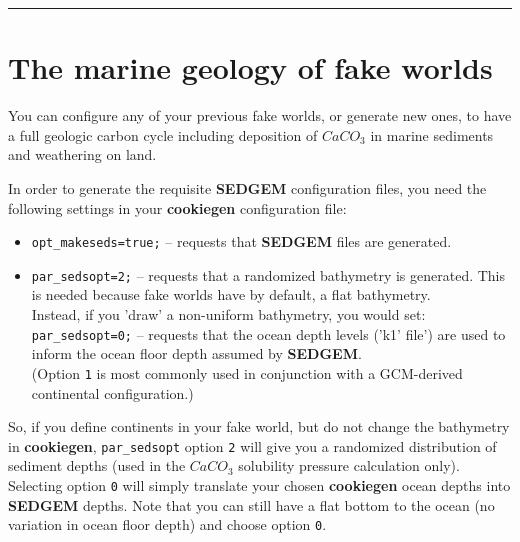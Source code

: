 \vspace{1mm}\noindent\rule{4cm}{0.1mm}\vspace{2mm}

\newpage

\section{The marine geology of fake worlds}

You can configure any of your previous fake worlds, or generate new ones, to have a full geologic carbon cycle including deposition of \(CaCO_{3}\) in marine sediments and weathering on land.

In order to generate the requisite \textbf{SEDGEM} configuration files, you need the following settings in your \textbf{cookiegen} configuration file:

\begin{itemize}[noitemsep]
\vspace{1mm}
\item \texttt{opt\_makeseds=true;} --  requests that \textbf{SEDGEM} files are generated.
\vspace{1mm}
\item \texttt{par\_sedsopt=2;} -- requests that a randomized bathymetry is generated. This is needed because fake worlds have by default, a flat bathymetry.
\\Instead, if you 'draw' a non-uniform bathymetry, you would set:
\\ \texttt{par\_sedsopt=0;} -- requests that the ocean depth levels ('k1' file') are used to inform the ocean floor depth assumed by \textbf{SEDGEM}.
\\(Option \texttt{1} is most commonly used in conjunction with a GCM-derived continental configuration.)
\end{itemize}

\vspace{1mm}
So, if you define continents in your fake world, but do not change the bathymetry in \textbf{cookiegen}, \texttt{par\_sedsopt} option \texttt{2} will give you a randomized distribution of sediment depths (used in the \(CaCO_{3}\) solubility pressure calculation only). Selecting option \texttt{0} will simply translate your chosen \textbf{cookiegen} ocean depths into \textbf{SEDGEM} depths. Note that you can still have a flat bottom to the ocean (no variation in ocean floor depth) and choose option \texttt{0}.

